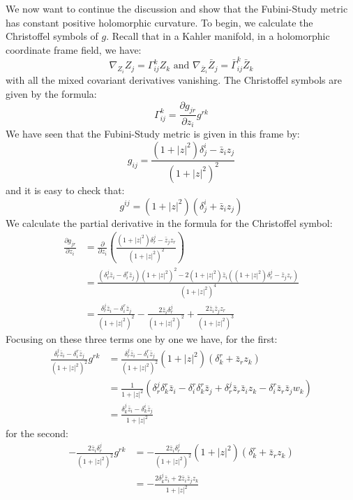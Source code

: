 \documentclass[11pt]{amsart}
\theoremstyle{definition}
\def \del{ \partial }
\begin{document}
We now want to continue the discussion and show that the Fubini-Study metric has constant positive holomorphic curvature.  To begin, we calculate the Christoffel symbols of $g$.  Recall that in a Kahler manifold, in a holomorphic coordinate frame field, we have:
%
$$\nabla_{ Z_i }{ Z_j }= \Gamma^k_{ij} Z_k \text{ and } \nabla_{ \bar{Z}_i }{ \bar{Z}_j } = \bar{ \Gamma }^k_{ij} \bar{Z}_k $$
%
with all the mixed covariant derivatives vanishing.  The Christoffel symbols are given by the formula:
%
$$ \Gamma^k_{ij} = \frac{ \del g_{jr} }{\del z_i} g^{rk} $$
%
We have seen that the Fubini-Study metric is given in this frame by:
%
$$ g_{ij} = \frac{ (1 + |z|^2)\delta^i_j - \bar{z}_i z_j }{ (1 + |z|^2)^2 } $$
%
and it is easy to check that:
%
$$g^{ij} = (1 + |z|^2)( \delta^i_j + \bar{z}_i z_j )$$
%
We calculate the partial derivative in the formula for the Christoffel symbol:
%
\begin{align*}
\frac{ \del g_{jr} }{\del z_i} &= \frac{\del}{ \del z_i }\left( \frac{ (1 + |z|^2) \delta^j_r - \bar{z}_j z_r }{ (1 + |z|^2)^2 } \right) \\
&= \frac{ ( \delta^j_r \bar{z}_i - \delta^r_i \bar{z}_j ) (1 + |z|^2 )^2 - 2 (1 + |z|^2 ) \bar{z}_i( (1 + |z|^2)\delta^j_r - \bar{z}_j z_r )}{ (1 + |z|^2 )^4 } \\
&= \frac{ \delta^j_r \bar{z}_i - \delta^r_i \bar{z}_j }{ (1 + |z|^2)^2 } - \frac{ 2 \bar{z}_i \delta^j_r }{ (1 + |z|^2)^2 } + \frac{ 2 \bar{z}_i \bar{z}_j z_r }{ (1 + |z|^2)^3 }
\end{align*}
%
Focusing on these three terms one by one we have, for the first:
%
\begin{align*}
\frac{ \delta^j_r \bar{z}_i - \delta^r_i \bar{z}_j }{ (1 + |z|^2)^2 } g^{rk} &= \frac{ \delta^j_r \bar{z}_i - \delta^r_i \bar{z}_j }{ (1 + |z|^2)^2 } (1 + |z|^2)( \delta^r_k + \bar{z}_r z_k ) \\
&= \frac{1}{ 1 + |z|^2 } ( \delta^j_r \delta^r_k \bar{z}_i - \delta^r_i \delta^r_k \bar{z}_j + \delta^j_r \bar{z}_r \bar{z}_i z_k - \delta^r_i \bar{z}_r \bar{z}_j w_k ) \\
&= \frac{ \delta^j_k \bar{z}_i - \delta^i_k \bar{z}_j }{ 1 + |z|^2 }
\end{align*}
%
for the second:
%
\begin{align*}
- \frac{ 2 \bar{z}_i \delta^j_r }{ (1 + |z|^2)^2 }g^{rk} &= - \frac{ 2 \bar{z}_i \delta^j_r }{ (1 + |z|^2)^2 }(1 + |z|^2)( \delta^r_k + \bar{z}_r z_k ) \\
&= - \frac{2 \delta^j_k \bar{z}_i + 2 \bar{z}_i \bar{z}_j z_k}{1 + |z|^2}\\
\end{align*}
\end{document}
